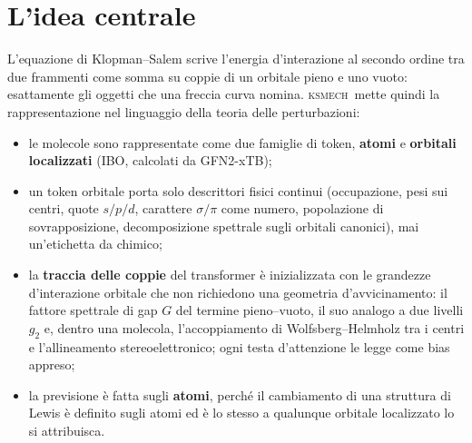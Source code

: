 \documentclass[11pt,a4paper]{report}
\newcommand{\ksm}{\textsc{ksmech}}
\begin{document}
\section{L'idea centrale}
L'equazione di Klopman--Salem scrive l'energia d'interazione al secondo ordine tra due frammenti
come somma su coppie di un orbitale pieno e uno vuoto: esattamente gli oggetti che una freccia curva
nomina. \ksm\ mette quindi la rappresentazione nel linguaggio della teoria delle perturbazioni:
\begin{itemize}
\item le molecole sono rappresentate come due famiglie di token, \textbf{atomi} e \textbf{orbitali
  localizzati} (IBO, calcolati da GFN2-xTB);
\item un token orbitale porta solo descrittori fisici continui (occupazione, pesi sui centri, quote
  $s/p/d$, carattere $\sigma/\pi$ come numero, popolazione di sovrapposizione, decomposizione
  spettrale sugli orbitali canonici), mai un'etichetta da chimico;
\item la \textbf{traccia delle coppie} del transformer è inizializzata con le grandezze
  d'interazione orbitale che non richiedono una geometria d'avvicinamento: il fattore spettrale di
  gap $G$ del termine pieno--vuoto, il suo analogo a due livelli $g_2$ e, dentro una molecola,
  l'accoppiamento di Wolfsberg--Helmholz tra i centri e l'allineamento stereoelettronico; ogni testa
  d'attenzione le legge come bias appreso;
\item la previsione è fatta sugli \textbf{atomi}, perché il cambiamento di una struttura di Lewis è
  definito sugli atomi ed è lo stesso a qualunque orbitale localizzato lo si attribuisca.
\end{itemize}
\end{document}
